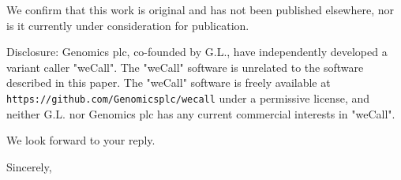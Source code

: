 \documentclass[10pt]{letter}
\begin{document}
\begin{letter}{}
We confirm that this work is original and has not been published elsewhere, nor is it currently under consideration for publication.

Disclosure: Genomics plc, co-founded by G.L., have independently developed a variant caller "weCall".  The "weCall" software is unrelated to the software described in this paper.  The "weCall" software is freely available  at {\tt https://github.com/Genomicsplc/wecall} under a permissive license, and neither G.L. nor Genomics plc has any current commercial interests in "weCall".

We look forward to your reply.

\closing{Sincerely,}

\end{letter}
\end{document}
